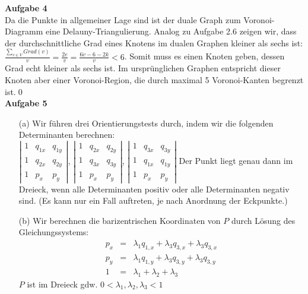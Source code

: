 \documentclass{article}
\begin{document}
\textbf{Aufgabe 4}\\
Da die Punkte in allgemeiner Lage sind ist der duale Graph zum Voronoi-Diagramm eine Delauny-Triangulierung. Analog zu Aufgabe 2.6 zeigen wir, dass der durchschnittliche Grad eines Knotens im dualen Graphen kleiner als sechs ist: $\displaystyle \frac{\sum\limits_{v\in V} Grad(v)}{v} = \frac{2e}{v} = \frac{6v -6 -2k}{v} < 6$. Somit muss es einen Knoten geben, dessen Grad echt kleiner als sechs ist. Im urspr\"unglichen Graphen entspricht dieser Knoten aber einer Voronoi-Region, die durch maximal 5 Voronoi-Kanten begrenzt ist.\qed\\

\textbf{Aufgabe 5}\\
\begin{itemize}
\item[(a)] Wir f\"uhren drei Orientierungstests durch, indem wir die folgenden Determinanten berechnen:\\
$\left|\begin{array}{ccc}1 & q_{1x} & q_{1y} \\ 1 & q_{2x} & q_{2y} \\ 1 & p_{x} & p_{y} \end{array}\right|$,
$\left|\begin{array}{ccc}1 & q_{2x} & q_{2y} \\ 1 & q_{3x} & q_{3y} \\ 1 & p_{x} & p_{y} \end{array}\right|$,
$\left|\begin{array}{ccc}1 & q_{3x} & q_{3y} \\ 1 & q_{1x} & q_{1y} \\ 1 & p_{x} & p_{y} \end{array}\right|$ Der Punkt liegt genau dann im Dreieck, wenn alle Determinanten positiv oder alle Determinanten negativ sind. (Es kann nur ein Fall auftreten, je nach Anordnung der Eckpunkte.)
\item[(b)] Wir berechnen die barizentrischen Koordinaten von $P$ durch L\"osung des Gleichungssystems:
\begin{eqnarray*}
p_x &=& \lambda_1q_{1,x} + \lambda_3q_{3,x} + \lambda_3q_{3,x}\\
p_y &=& \lambda_1q_{1,y} + \lambda_3q_{3,y} + \lambda_3q_{3,y}\\
1 &=& \lambda_1 + \lambda_2 + \lambda_3
\end{eqnarray*}
$P$ ist im Dreieck gdw. $0< \lambda_1, \lambda_2, \lambda_3 <1$
\end{itemize}
\end{document}

